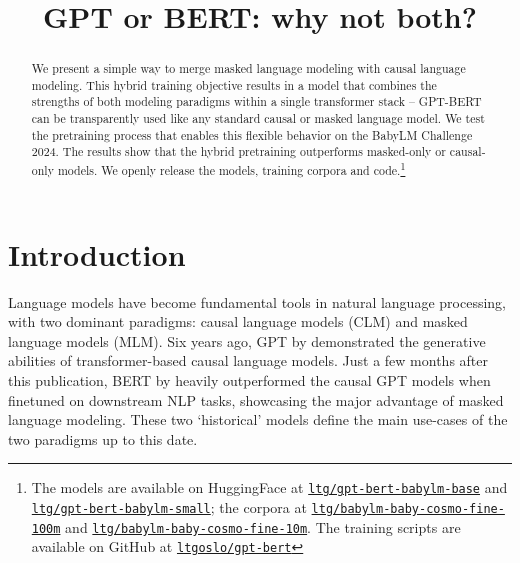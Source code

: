 \title{GPT or BERT: why not both?}



\maketitle
\def\thefootnote{*}\def\thefootnote{\arabic{footnote}}
\begin{abstract}
We present a simple way to merge masked language modeling with causal language modeling. This hybrid training objective results in a model that combines the strengths of both modeling paradigms within a single transformer stack -- \textsc{GPT-BERT} can be transparently used like any standard causal or masked language model. We test the pretraining process that enables this flexible behavior on the BabyLM Challenge 2024. The results show that the hybrid pretraining outperforms masked-only or causal-only models. We openly release the models, training corpora and code.\footnote{The models are available on HuggingFace at \href{https://huggingface.co/ltg/gpt-bert-babylm-base}{\texttt{ltg\-/gpt\--bert\--baby\-lm\--base}} and \href{https://huggingface.co/ltg/gpt-bert-babylm-small}{\texttt{ltg\-/gpt\--bert\--baby\-lm\--small}}; the corpora at \href{https://huggingface.co/datasets/ltg/babylm-2024-baby-cosmo-fine-100m}{\texttt{ltg\-/baby\-lm-ba\-by-cos\-mo-fine-100m}} and \href{https://huggingface.co/datasets/ltg/babylm-2024-baby-cosmo-fine-10m}{\texttt{ltg\-/baby\-lm-ba\-by-cos\-mo-fine-10m}}. The training scripts are available on GitHub at \href{https://github.com/ltgoslo/gpt-bert}{\texttt{ltg\-oslo\-/gpt\--bert}}}
\vspace{1em}
\end{abstract}

\section{Introduction}
\label{sec:introduction}

Language models have become fundamental tools in natural language processing, with two dominant paradigms: causal language models (CLM) and masked language models (MLM). Six years ago, GPT by  demonstrated the generative abilities of transformer-based causal language models. Just a few months after this publication, BERT by  heavily outperformed the causal GPT models when finetuned on downstream NLP tasks, showcasing the major advantage of masked language modeling. These two `historical' models define the main use-cases of the two paradigms up to this date.

